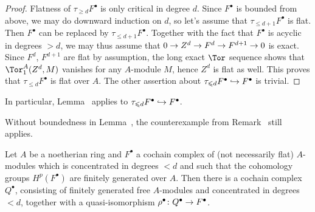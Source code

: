 \documentclass[a4paper,parskip=half,numbers=enddot, DIV=12]{scrreprt}
\renewcommand{\geq}{\geqslant}
\renewcommand{\leq}{\leqslant}
\begin{document}
\begin{proof}
	Flatness of $\tau_{\geq d}F^\bullet$ is only critical in degree $d$. Since $F^\bullet$ is bounded from above, we may do downward induction on $d$, so let's assume that $\tau_{\leq d+1}F^\bullet$ is flat. Then $F^\bullet$ can be replaced by $\tau_{\leq d+1}F^\bullet$. Together with the fact that $F^\bullet$ is acyclic in degrees $>d$, we may thus assume that $0\morphism Z^d\morphism F^d\morphism F^{d+1}\morphism 0$ is exact. Since $F^d$, $F^{d+1}$ are flat by assumption, the long exact $\Tor$ sequence shows that $\Tor_1^A(Z^d,M)$ vanishes for any $A$-module $M$, hence $Z^d$ is flat as well. This proves that $\tau_{\leq d}F^\bullet$ is flat over $A$. The other assertion about $\tau_{\leq d}F^\bullet\monomorphism F^\bullet$ is trivial.
\end{proof}
\begin{rem}
	\begin{alphanumerate}
		\item In particular, Lemma~ applies to $\tau_{\leq d}F^\bullet\monomorphism F^\bullet$.
		\item Without boundedness in Lemma~, the counterexample from Remark~ still applies.
	\end{alphanumerate}
\end{rem}
\begin{lem}
	Let $A$ be a noetherian ring and $F^\bullet$ a cochain complex of (not necessarily flat) $A$-modules which is concentrated in degrees $< d$ and such that the cohomology groups $H^p(F^\bullet)$ are finitely generated over $A$. Then there is a cochain complex $Q^\bullet$, consisting of finitely generated free $A$-modules and concentrated in degrees $<d$, together with a quasi-isomorphism $\rho^\bullet\colon Q^\bullet\morphism F^\bullet$.
\end{lem}
\end{document}
